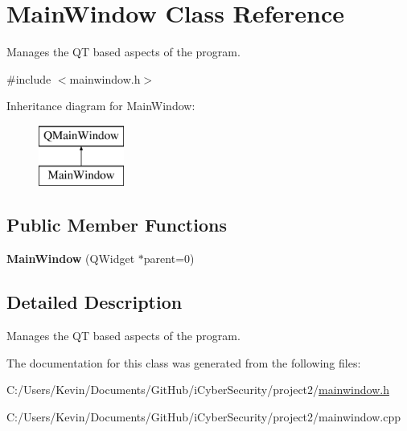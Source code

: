 \hypertarget{class_main_window}{}\section{Main\+Window Class Reference}
\label{class_main_window}


Manages the QT based aspects of the program.  




{\ttfamily \#include $<$mainwindow.\+h$>$}

Inheritance diagram for Main\+Window\+:\begin{figure}[H]
\begin{center}
\leavevmode
\includegraphics[height=2.000000cm]{class_main_window}
\end{center}
\end{figure}
\subsection*{Public Member Functions}
\begin{DoxyCompactItemize}
\item 
\mbox{\label{class_main_window_a8b244be8b7b7db1b08de2a2acb9409db}} 
{\bfseries Main\+Window} (Q\+Widget $\ast$parent=0)
\end{DoxyCompactItemize}


\subsection{Detailed Description}
Manages the QT based aspects of the program. 

The documentation for this class was generated from the following files\+:\begin{DoxyCompactItemize}
\item 
C\+:/\+Users/\+Kevin/\+Documents/\+Git\+Hub/i\+Cyber\+Security/project2/\mbox{\hyperlink{mainwindow_8h}{mainwindow.\+h}}\item 
C\+:/\+Users/\+Kevin/\+Documents/\+Git\+Hub/i\+Cyber\+Security/project2/mainwindow.\+cpp\end{DoxyCompactItemize}
